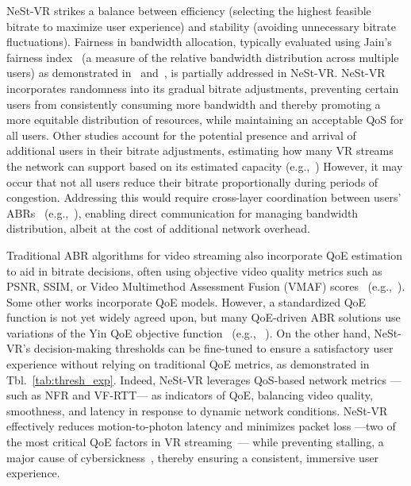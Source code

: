 NeSt-VR strikes a balance between efficiency (selecting the highest feasible bitrate to maximize user experience) and stability (avoiding unnecessary bitrate fluctuations). Fairness in bandwidth allocation, typically evaluated using Jain’s fairness index~\cite{jain1984quantitative} (a measure of the relative bandwidth distribution across multiple users) as demonstrated in~\cite{vergados2023adaptive} and~\cite{jiang2012improving}, is partially addressed in NeSt-VR. NeSt-VR incorporates randomness into its gradual bitrate adjustments, preventing certain users from consistently consuming more bandwidth and thereby promoting a more equitable distribution of resources, while maintaining an acceptable QoS for all users. Other studies account for the potential presence and arrival of additional users in their bitrate adjustments, estimating how many VR streams the network can support based on its estimated capacity (e.g.,~\cite{liubogoshchev2021everest, korneev2024model})
However, it may occur that not all users reduce their bitrate proportionally during periods of congestion. Addressing this would require cross-layer coordination between users' ABRs~\cite{jiang2012improving} (e.g.,~\cite{liu2012case}), enabling direct communication for managing bandwidth distribution, albeit at the cost of additional network overhead.

Traditional ABR algorithms for video streaming also incorporate QoE estimation to aid in bitrate decisions, often using objective video quality metrics such as PSNR, SSIM, or Video Multimethod Assessment Fusion (VMAF) scores~\cite{rassool2017vmaf} (e.g.,~\cite{kim2023http, lee2018sdn, DAVE_RL}). Some other works incorporate QoE models. However, a standardized QoE function is not yet widely agreed upon, but many QoE-driven ABR solutions use variations of the Yin QoE objective function~\cite{yin2015control} (e.g., ~\cite{lee2024adaptive, wu2024ap, chang2019edge}).
On the other hand, NeSt-VR's decision-making thresholds can be fine-tuned to ensure a satisfactory user experience without relying on traditional QoE metrics, as demonstrated in Tbl.~\ref{tab:thresh_exp}. Indeed, NeSt-VR leverages QoS-based network metrics ---such as NFR and VF-RTT--- as indicators of QoE, balancing video quality, smoothness, and latency in response to dynamic network conditions. NeSt-VR effectively reduces motion-to-photon latency and minimizes packet loss ---two of the most critical QoE factors in VR streaming~\cite{itutg1035}--- while preventing stalling, a major cause of cybersickness~\cite{shahid2020evaluating}, thereby ensuring a consistent, immersive user experience.


